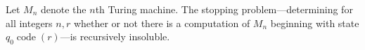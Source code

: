 Let $M_n$ denote the $n$th Turing machine. The stopping problem---determining for all integers $n, r$ whether or not there is a computation of $M_n$ beginning with state $q_0 \operatorname{code}(r)$---is recursively insoluble.
